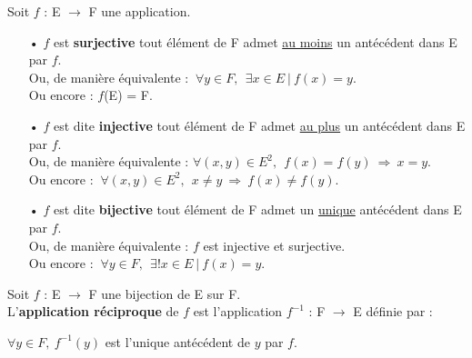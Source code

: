 \vspace{1cm}

Soit \(f\) : E \(\to\) F une application.\vspace{-0.2cm}
\begin{itemize}[leftmargin=0cm]
    \item[•] \(f\) est \textbf{surjective} \ssi tout élément de F admet \underline{au moins} un antécédent dans E par \(f\). \\
    Ou, de manière équivalente : \( \ \forall y\in  F,\ \ \exists x\in E \ |\ f(x)=y. \) \\
    Ou encore : \(f\)(E) = F.\vspace{0.3cm}
    
    \item[•] \(f\) est dite \textbf{injective} \ssi tout élément de F admet \underline{au plus} un antécédent dans E par \(f\).\\
    Ou, de manière équivalente :  \( \forall (x,y)\in E^2, \ \ f(x)=f(y)\ \Rightarrow \ x=y \). \\
    Ou encore : \( \ \forall (x,y)\in E^2, \ \ x\neq y\ \Rightarrow \ f(x)\neq f(y).\)\vspace{0.3cm}
    
    \item[•] \(f\) est dite \textbf{bijective} \ssi tout élément de F admet un \underline{unique} antécédent dans E par \(f\). \\
    Ou, de manière équivalente : \(f\) est injective et surjective. \\
    Ou encore : \( \ \forall y\in F, \ \ \exists !x\in E \ | \ f(x)=y.\)
\end{itemize}

\vspace{1cm}

Soit \(f\) : E \(\to\) F une bijection de E sur F.\\
L'\textbf{application réciproque} de \(f\) est l'application \(f^{-1}\) : F \(\to\) E définie par :\vspace{-0.2cm}
\begin{center}
    \( \forall y\in F,\ f^{-1}(y)\) est l'unique antécédent de \(y\) par \(f\).    
\end{center}

\vspace{1.2cm}

